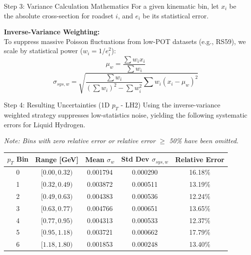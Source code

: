 \documentclass[aspectratio=169]{beamer}
\begin{document}
\begin{frame}{Step 3: Variance Calculation Mathematics}
    For a given kinematic bin, let $x_i$ be the absolute cross-section for roadset $i$, and $e_i$ be its statistical error.
    \vspace{0.5cm}
    
    \textbf{Inverse-Variance Weighting:} \\
    To suppress massive Poisson fluctuations from low-POT datasets (e.g., RS59), we scale by statistical power ($w_i = 1/e_i^2$):
    \vspace{0.3cm}
    \[
    \mu_w = \frac{\sum w_i x_i}{\sum w_i}
    \]
    \vspace{0.3cm}
    \[
    \sigma_{sys, w} = \sqrt{ \frac{\sum w_i}{\left(\sum w_i\right)^2 - \sum w_i^2} \sum w_i (x_i - \mu_w)^2 }
    \]
\end{frame}

\begin{frame}{Step 4: Resulting Uncertainties (1D $p_T$ - LH2)}
    Using the inverse-variance weighted strategy suppresses low-statistics noise, yielding the following systematic errors for Liquid Hydrogen.
    
    \textit{Note: Bins with zero relative error or relative error $\geq$ 50\% have been omitted.}
    \vspace{0.3cm}
    
    \begin{table}[]
        \centering
        \begin{tabular}{@{}ccccc@{}}
        \toprule
        \textbf{$p_T$ Bin} & \textbf{Range [GeV]} & \textbf{Mean $\sigma_w$} & \textbf{Std Dev $\sigma_{sys,w}$} & \textbf{Relative Error} \\ \midrule
        0 & $[0.00, 0.32)$ & 0.001794 & 0.000290 & 16.18\% \\
        1 & $[0.32, 0.49)$ & 0.003872 & 0.000511 & 13.19\% \\
        2 & $[0.49, 0.63)$ & 0.004383 & 0.000536 & 12.24\% \\
        3 & $[0.63, 0.77)$ & 0.004766 & 0.000651 & 13.65\% \\
        4 & $[0.77, 0.95)$ & 0.004313 & 0.000533 & 12.37\% \\
        5 & $[0.95, 1.18)$ & 0.003721 & 0.000662 & 17.79\% \\
        6 & $[1.18, 1.80)$ & 0.001853 & 0.000248 & 13.40\% \\
        \bottomrule
        \end{tabular}
    \end{table}
\end{frame}
\end{document}
